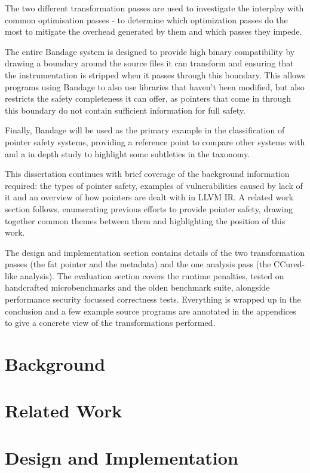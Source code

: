 \documentclass[a4paper,12pt,twoside,openright]{report}
\begin{document}
The two different transformation passes are used to investigate the interplay with common optimisation passes - to determine which optimization passes do the most to mitigate the overhead generated by them and which passes they impede.

The entire Bandage system is designed to provide high binary compatibility by drawing a boundary around the source files it can transform and ensuring that the instrumentation is stripped when it passes through this boundary.
This allows programs using Bandage to also use libraries that haven't been modified, but also restricts the safety completeness it can offer, as pointers that come in through this boundary do not contain sufficient information for full safety.

Finally, Bandage will be used as the primary example in the classification of pointer safety systems, providing a reference point to compare other systems with and a in depth study to highlight some subtleties in the taxonomy.

This dissertation continues with brief coverage of the background information required: the types of pointer safety, examples of vulnerabilities caused by lack of it and an overview of how pointers are dealt with in LLVM IR.
A related work section follows, enumerating previous efforts to provide pointer safety, drawing together common themes between them and highlighting the position of this work.

The design and implementation section contains details of the two transformation passes (the fat pointer and the metadata) and the one analysis pass (the CCured-like analysis).
The evaluation section covers the runtime penalties, tested on handcrafted microbenchmarks and the olden benchmark suite, alongside performance security focussed correctness tests.
Everything is wrapped up in the conclusion and a few example source programs are annotated in the appendices to give a concrete view of the transformations performed.

\chapter{Background} 


\chapter{Related Work} 


\chapter{Design and Implementation} 

\end{document}
